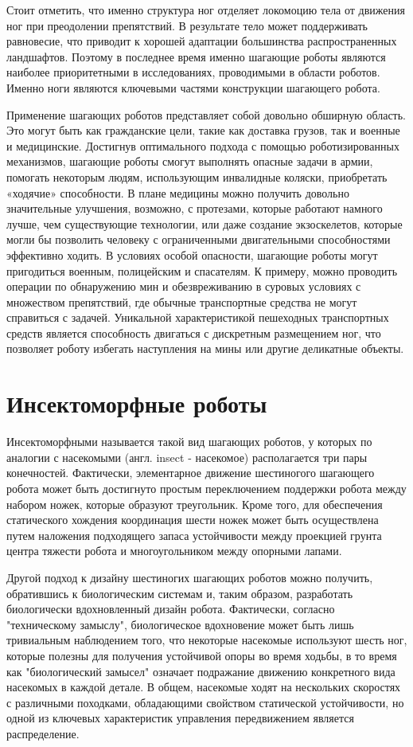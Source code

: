 Стоит отметить, что именно структура ног отделяет локомоцию тела от движения ног при преодолении препятствий. В результате тело может поддерживать равновесие, что приводит к хорошей адаптации большинства распространенных ландшафтов. Поэтому в последнее время именно шагающие роботы являются наиболее приоритетными в исследованиях, проводимыми в области роботов. Именно ноги являются ключевыми частями конструкции шагающего робота.

Применение шагающих роботов представляет собой довольно обширную область. Это могут быть как гражданские цели, такие как доставка грузов, так и военные и медицинские. Достигнув оптимального подхода с помощью роботизированных механизмов, шагающие роботы смогут выполнять опасные задачи в армии, помогать некоторым людям, использующим инвалидные коляски, приобретать «ходячие» способности. В плане медицины можно получить довольно значительные улучшения, возможно, с протезами, которые работают намного лучше, чем существующие технологии, или даже создание экзоскелетов, которые могли бы позволить человеку с ограниченными двигательными способностями эффективно ходить. В условиях особой опасности, шагающие роботы могут пригодиться военным, полицейским и спасателям. К примеру, можно проводить операции по обнаружению мин и обезвреживанию в суровых условиях с множеством препятствий, где обычные транспортные средства не могут справиться с задачей. Уникальной характеристикой пешеходных транспортных средств является способность двигаться с дискретным размещением ног, что позволяет роботу избегать наступления на мины или другие деликатные объекты.

\section{Инсектоморфные роботы}

Инсектоморфными называется такой вид шагающих роботов, у которых по аналогии с насекомыми (англ. insect - насекомое) располагается три пары конечностей. Фактически, элементарное движение шестиногого шагающего робота может быть достигнуто простым переключением поддержки робота между набором ножек, которые образуют треугольник. Кроме того, для обеспечения статического хождения координация шести ножек может быть осуществлена путем наложения подходящего запаса устойчивости между проекцией грунта центра тяжести робота и многоугольником между опорными лапами.

Другой подход к дизайну шестиногих шагающих роботов можно получить, обратившись к биологическим системам и, таким образом, разработать биологически вдохновленный дизайн робота. Фактически, согласно "техническому замыслу"{}, биологическое вдохновение может быть лишь тривиальным наблюдением того, что некоторые насекомые используют шесть ног, которые полезны для получения устойчивой опоры во время ходьбы, в то время как "биологический замысел"{} означает подражание движению конкретного вида насекомых в каждой детале. В общем, насекомые ходят на нескольких скоростях с различными походками, обладающими свойством статической устойчивости, но одной из ключевых характеристик управления передвижением является распределение.


